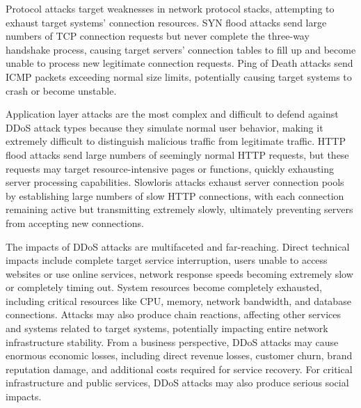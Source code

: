 \documentclass[12pt,a4paper]{article}
\begin{document}
Protocol attacks target weaknesses in network protocol stacks, attempting to exhaust target systems' connection resources. SYN flood attacks send large numbers of TCP connection requests but never complete the three-way handshake process, causing target servers' connection tables to fill up and become unable to process new legitimate connection requests. Ping of Death attacks send ICMP packets exceeding normal size limits, potentially causing target systems to crash or become unstable.

Application layer attacks are the most complex and difficult to defend against DDoS attack types because they simulate normal user behavior, making it extremely difficult to distinguish malicious traffic from legitimate traffic. HTTP flood attacks send large numbers of seemingly normal HTTP requests, but these requests may target resource-intensive pages or functions, quickly exhausting server processing capabilities. Slowloris attacks exhaust server connection pools by establishing large numbers of slow HTTP connections, with each connection remaining active but transmitting extremely slowly, ultimately preventing servers from accepting new connections.

The impacts of DDoS attacks are multifaceted and far-reaching. Direct technical impacts include complete target service interruption, users unable to access websites or use online services, network response speeds becoming extremely slow or completely timing out. System resources become completely exhausted, including critical resources like CPU, memory, network bandwidth, and database connections. Attacks may also produce chain reactions, affecting other services and systems related to target systems, potentially impacting entire network infrastructure stability. From a business perspective, DDoS attacks may cause enormous economic losses, including direct revenue losses, customer churn, brand reputation damage, and additional costs required for service recovery. For critical infrastructure and public services, DDoS attacks may also produce serious social impacts.
\end{document}
